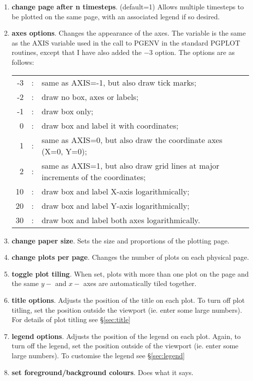 \documentclass[a4paper,11pt]{article}
\begin{document}
\begin{enumerate}
\item \textbf{change page after n timesteps}. (default=1) Allows multiple timesteps to be plotted on
the same page, with an associated legend if so desired.
\item \textbf{axes options}. Changes the appearance of the axes. The variable is
the same as the AXIS variable used in the call to PGENV in the standard PGPLOT
routines, except that I have also added the $-3$ option. The options are
as follows:

\begin{tabular}{rcp{}}
-3 & : & same as AXIS=-1, but also draw tick marks; \\
 -2 & : & draw no box, axes or labels; \\
 -1 & : & draw box only; \\
  0 & : & draw box and label it with coordinates; \\
  1 & : & same as AXIS=0, but also draw the coordinate axes (X=0, Y=0); \\
  2 & : & same as AXIS=1, but also draw grid lines at major increments of the coordinates; \\
  10 & : & draw box and label X-axis logarithmically; \\
  20 & : & draw box and label Y-axis logarithmically; \\
  30 & : & draw box and label both axes logarithmically. \\
\end{tabular}

\item \textbf{change paper size}. Sets the size and proportions of the plotting page.
\item \textbf{change plots per page}. Changes the number of plots on each
physical page.
\item \textbf{toggle plot tiling}. When set, plots with more than one plot on
the page and the same $y-$ and $x-$ axes are automatically tiled together.
\item \textbf{title options}. Adjusts the position of the title on
each plot. To turn off plot titling, set the position outside the viewport (ie.
enter some large numbers). For details of plot titling see \S\vref{sec:title}
\item \textbf{legend options}. Adjusts the position of the legend on
each plot. Again, to turn off the legend, set the position outside of the
viewport (ie. enter some large numbers). To customise the legend see
\S\vref{sec:legend}
\item \textbf{set foreground/background colours}. Does what it says.
\end{enumerate}
\end{document}
